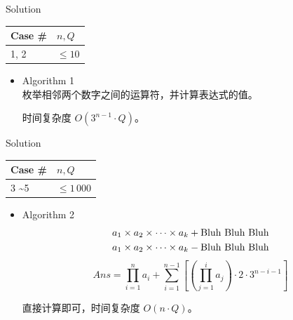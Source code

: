 \documentclass[UTF8]{beamer}
\begin{document}
\begin{frame}{Solution}

\begin{tabularx}{\textwidth}{X|X} \hline
Case \# & $n, Q$ \\ \hline \hline
1, 2                 & $\leq 10$       \\ \hline
\end{tabularx}
\begin{itemize}
    \item Algorithm 1 \\
        枚举相邻两个数字之间的运算符，并计算表达式的值。

        时间复杂度 $O(3^{n-1} \cdot Q)$。
\end{itemize}

\end{frame}

\begin{frame}{Solution}

\begin{tabularx}{\textwidth}{X|X} \hline
Case \# & $n, Q$ \\ \hline \hline
3 \textasciitilde 5  & $\leq 1\,000$   \\ \hline
\end{tabularx}
\begin{itemize}
    \item Algorithm 2 \\
        \begin{align*}
            &a_1 \times a_2 \times \dots \times a_k + {\rm Bluh\ Bluh\ Bluh} \\
            &a_1 \times a_2 \times \dots \times a_k - {\rm Bluh\ Bluh\ Bluh}
        \end{align*}
        \pause
        $$
            Ans = \prod_{i = 1}^{n} a_i + \sum_{i = 1}^{n - 1} \left [\left (\prod_{j = 1}^i a_j \right ) \cdot 2 \cdot 3^{n - i - 1}\right ]
        $$

        直接计算即可，时间复杂度 $O(n \cdot Q)$。
\end{itemize}

\end{frame}
\end{document}
